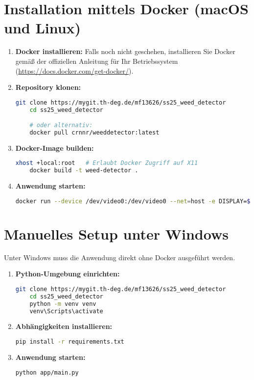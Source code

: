 \documentclass[12pt, a4paper]{scrreprt}
\begin{document}
\section{Installation mittels Docker (macOS und Linux)}
\begin{enumerate}
    \item \textbf{Docker installieren:} Falls noch nicht geschehen, installieren Sie Docker gemäß der offiziellen Anleitung für Ihr Betriebssystem (\url{https://docs.docker.com/get-docker/}).
    
    \item \textbf{Repository klonen:}
    \begin{lstlisting}[language=bash]
    git clone https://mygit.th-deg.de/mf13626/ss25_weed_detector
    cd ss25_weed_detector

    # oder alternativ:
    docker pull crnnr/weeddetector:latest
    \end{lstlisting}
    
    \item \textbf{Docker-Image builden:}
    \begin{lstlisting}[language=bash]
    xhost +local:root   # Erlaubt Docker Zugriff auf X11
    docker build -t weed-detector .
    \end{lstlisting}
    
    \item \textbf{Anwendung starten:}
    \begin{lstlisting}[language=bash]
    docker run --device /dev/video0:/dev/video0 --net=host -e DISPLAY=$DISPLAY -v /tmp/.X11-unix:/tmp/.X11-unix weed-detector
    \end{lstlisting}
\end{enumerate}

\section{Manuelles Setup unter Windows}
Unter Windows muss die Anwendung direkt ohne Docker ausgeführt werden.

\begin{enumerate}
    \item \textbf{Python-Umgebung einrichten:}
    \begin{lstlisting}[language=bash]
    git clone https://mygit.th-deg.de/mf13626/ss25_weed_detector
    cd ss25_weed_detector
    python -m venv venv
    venv\Scripts\activate
    \end{lstlisting}
    
    \item \textbf{Abhängigkeiten installieren:}
    \begin{lstlisting}[language=bash]
    pip install -r requirements.txt
    \end{lstlisting}
    
    \item \textbf{Anwendung starten:}
    \begin{lstlisting}[language=bash]
    python app/main.py
    \end{lstlisting}
\end{enumerate}
\end{document}
